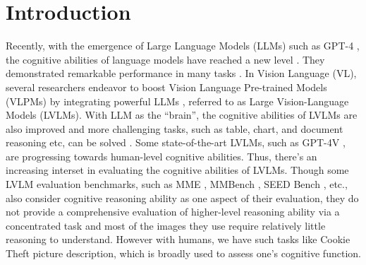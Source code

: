 \section{Introduction}


Recently, with the emergence of Large Language Models (LLMs) such as GPT-4 \cite{openai2023gpt4}, the cognitive abilities of language models have reached a new level \cite{zhuang2023efficiently}.
They demonstrated remarkable performance in many tasks \cite{bubeck2023sparks}.
In Vision Language (VL), several researchers \cite{zhu2023minigpt, liu2023llava, ye2023mplug} endeavor to boost Vision Language Pre-trained Models (VLPMs) by integrating powerful LLMs \cite{touvron2023llama, chiang2023vicuna}, referred to as Large Vision-Language Models (LVLMs).
With LLM as the ``brain'', the cognitive abilities of LVLMs are also improved and more challenging tasks, such as table, chart, and document reasoning etc, can be solved \cite{yang2023dawn}. 
Some state-of-the-art LVLMs, such as GPT-4V \cite{openai2023gpt4}, 
are progressing towards human-level cognitive abilities.
Thus, there's an increasing interset in evaluating the cognitive abilities of LVLMs.
Though some LVLM evaluation benchmarks, such as MME \cite{fu2023mme}, MMBench \cite{liu2023mmbench}, SEED Bench \cite{li2023seed}, etc., 
also consider cognitive reasoning ability as one aspect of their evaluation, they do not provide a comprehensive evaluation of higher-level reasoning ability via a concentrated task and most of the images they use require relatively little reasoning to understand. 
However with humans, we have such tasks like Cookie Theft picture description, which is broadly used to assess one's cognitive function. 

